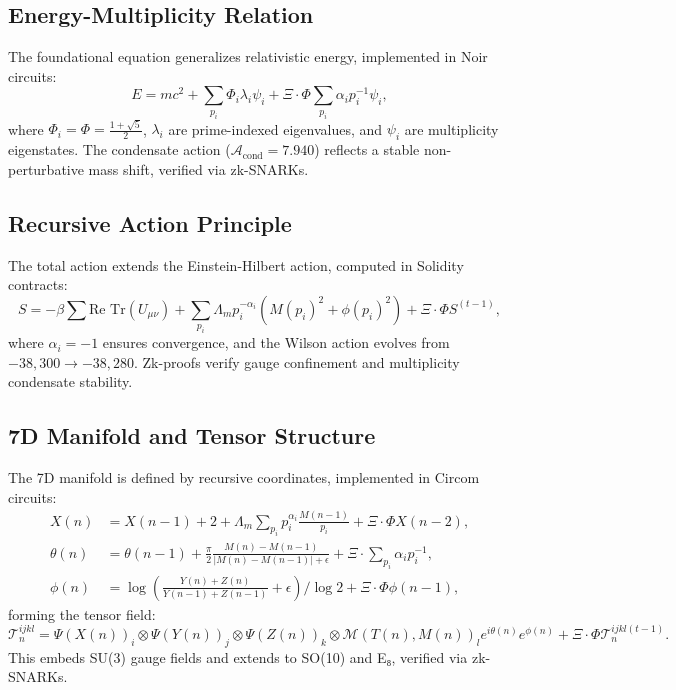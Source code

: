 \documentclass{article}
\theoremstyle{plain}
\begin{document}
\subsection{Energy-Multiplicity Relation}

The foundational equation generalizes relativistic energy, implemented in Noir circuits:
\begin{equation}
E = mc^2 + \sum_{p_i} \Phi_i \lambda_i \psi_i + \Xi \cdot \Phi \sum_{p_i} \alpha_i p_i^{-1} \psi_i,
\end{equation}
where \(\Phi_i = \Phi = \frac{1 + \sqrt{5}}{2}\), \(\lambda_i\) are prime-indexed eigenvalues, and \(\psi_i\) are multiplicity eigenstates. The condensate action (\(\mathcal{A}_{\text{cond}} = 7.940\)) reflects a stable non-perturbative mass shift, verified via zk-SNARKs.

\subsection{Recursive Action Principle}

The total action extends the Einstein-Hilbert action, computed in Solidity contracts:
\begin{equation}
S = -\beta \sum \text{Re Tr}(U_{\mu\nu}) + \sum_{p_i} \Lambda_m p_i^{-\alpha_i} (M(p_i)^2 + \phi(p_i)^2) + \Xi \cdot \Phi S^{(t-1)},
\end{equation}
where \(\alpha_i = -1\) ensures convergence, and the Wilson action evolves from \(-38,300 \to -38,280\). Zk-proofs verify gauge confinement and multiplicity condensate stability.

\subsection{7D Manifold and Tensor Structure}

The 7D manifold is defined by recursive coordinates, implemented in Circom circuits:
\begin{align}
X(n) &= X(n-1) + 2 + \Lambda_m \sum_{p_i} p_i^{\alpha_i} \frac{M(n-1)}{p_i} + \Xi \cdot \Phi X(n-2), \\
\theta(n) &= \theta(n-1) + \frac{\pi}{2} \frac{M(n) - M(n-1)}{|M(n) - M(n-1)| + \epsilon} + \Xi \cdot \sum_{p_i} \alpha_i p_i^{-1}, \\
\phi(n) &= \log\left( \frac{Y(n) + Z(n)}{Y(n-1) + Z(n-1)} + \epsilon \right) / \log 2 + \Xi \cdot \Phi \phi(n-1),
\end{align}
forming the tensor field:
\begin{equation}
\mathcal{T}_n^{ijkl} = \Psi(X(n))_i \otimes \Psi(Y(n))_j \otimes \Psi(Z(n))_k \otimes \mathcal{M}(T(n), M(n))_l e^{i \theta(n)} e^{\phi(n)} + \Xi \cdot \Phi \mathcal{T}_n^{ijkl(t-1)}.
\end{equation}
This embeds SU(3) gauge fields and extends to SO(10) and E₈, verified via zk-SNARKs.
\end{document}
